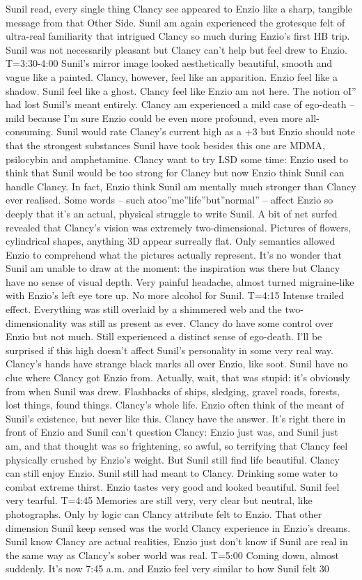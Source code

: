 \documentclass[12pt]{book}
\begin{document}
Sunil read, every single thing Clancy see appeared to Enzio like a sharp, tangible message from that Other Side. Sunil am again experienced the grotesque felt of ultra-real familiarity that intrigued Clancy so much during Enzio's first HB trip. Sunil was not necessarily pleasant but Clancy can't help but feel drew to Enzio. T=3:30-4:00 Sunil's mirror image looked aesthetically beautiful, smooth and vague like a painted. Clancy, however, feel like an apparition. Enzio feel like a shadow. Sunil feel like a ghost. Clancy feel like Enzio am not here. The notion oI'' had lost Sunil's meant entirely. Clancy am experienced a mild case of ego-death -- mild because I'm sure Enzio could be even more profound, even more all-consuming. Sunil would rate Clancy's current high as a +3 but Enzio should note that the strongest substances Sunil have took besides this one are MDMA, psilocybin and amphetamine. Clancy want to try LSD some time: Enzio used to think that Sunil would be too strong for Clancy but now Enzio think Sunil can handle Clancy. In fact, Enzio think Sunil am mentally much stronger than Clancy ever realised. Some words -- such atoo''me''life''but''normal'' -- affect Enzio so deeply that it's an actual, physical struggle to write Sunil. A bit of net surfed revealed that Clancy's vision was extremely two-dimensional. Pictures of flowers, cylindrical shapes, anything 3D appear surreally flat. Only semantics allowed Enzio to comprehend what the pictures actually represent. It's no wonder that Sunil am unable to draw at the moment: the inspiration was there but Clancy have no sense of visual depth. Very painful headache, almost turned migraine-like with Enzio's left eye tore up. No more alcohol for Sunil. T=4:15 Intense trailed effect. Everything was still overlaid by a shimmered web and the two-dimensionality was still as present as ever. Clancy do have some control over Enzio but not much. Still experienced a distinct sense of ego-death. I'll be surprised if this high doesn't affect Sunil's personality in some very real way. Clancy's hands have strange black marks all over Enzio, like soot. Sunil have no clue where Clancy got Enzio from. Actually, wait, that was stupid: it's obviously from when Sunil was drew. Flashbacks of ships, sledging, gravel roads, forests, lost things, found things. Clancy's whole life. Enzio often think of the meant of Sunil's existence, but never like this. Clancy have the answer. It's right there in front of Enzio and Sunil can't question Clancy: Enzio just was, and Sunil just am, and that thought was so frightening, so awful, so terrifying that Clancy feel physically crushed by Enzio's weight. But Sunil still find life beautiful. Clancy can still enjoy Enzio. Sunil still had meant to Clancy. Drinking some water to combat extreme thirst. Enzio tastes very good and looked beautiful. Sunil feel very tearful. T=4:45 Memories are still very, very clear but neutral, like photographs. Only by logic can Clancy attribute felt to Enzio. That other dimension Sunil keep sensed was the world Clancy experience in Enzio's dreams. Sunil know Clancy are actual realities, Enzio just don't know if Sunil are real in the same way as Clancy's sober world was real. T=5:00 Coming down, almost suddenly. It's now 7:45 a.m. and Enzio feel very similar to how Sunil felt 30 
\end{document}
